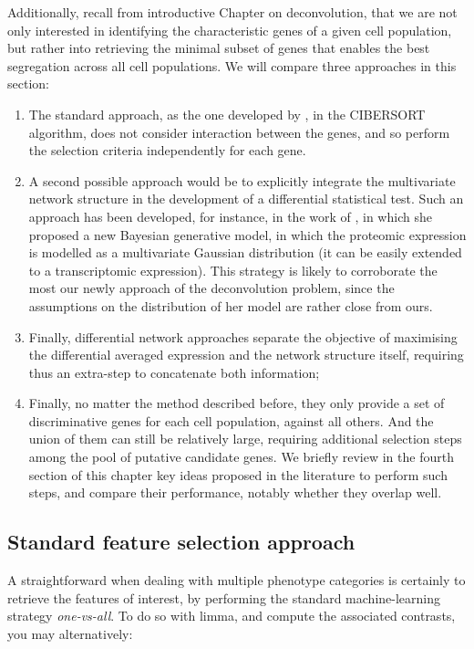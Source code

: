 Additionally, recall from introductive Chapter on deconvolution,  that we are not only interested in identifying the characteristic genes of a given cell population, but rather into retrieving the minimal subset of genes that enables the best segregation across all cell populations. We will compare three approaches in this section:

\begin{enumerate}
\item
  The standard approach, as the one developed by \autocite{newman_etal15}, in the CIBERSORT algorithm, does not consider interaction between the genes, and so perform the selection criteria independently for each gene.
\item
  A second possible approach would be to explicitly integrate the multivariate network structure in the development of a differential statistical test. Such an approach has been developed, for instance, in the work of \autocite{chion_etal22}, in which she proposed a new Bayesian generative model, in which the proteomic expression is modelled as a multivariate Gaussian distribution (it can be easily extended to a transcriptomic expression). This strategy is likely to corroborate the most our newly approach of the deconvolution problem, since the assumptions on the distribution of her model are rather close from ours.
\item
  Finally, differential network approaches separate the objective of maximising the differential averaged expression and the network structure itself, requiring thus an extra-step to concatenate both information;
\item
  Finally, no matter the method described before, they only provide a set of discriminative genes for each cell population, against all others. And the union of them can still be relatively large, requiring additional selection steps among the pool of putative candidate genes. We briefly review in the fourth section of this chapter key ideas proposed in the literature to perform such steps, and compare their performance, notably whether they overlap well.
\end{enumerate}


\subsection{Standard feature selection approach} 
\label{standard-feature-selection-approach}

A straightforward when dealing with multiple phenotype categories is certainly to retrieve the features of interest, by performing the standard machine-learning strategy \emph{one-vs-all}. To do so with limma, and compute the associated contrasts, you may alternatively:

